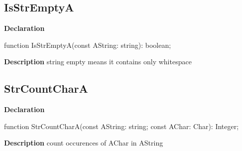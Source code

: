 \documentclass{report}
\newif\ifpdf
\begin{document}
\subsection*{IsStrEmptyA}
\fi
\label{PasDoc_Utils-IsStrEmptyA}
\begin{list}{}{
\setlength{\itemindent}{0cm}
\setlength{\listparindent}{0cm}
\setlength{\leftmargin}{\evensidemargin}
\addtolength{\leftmargin}{\tmplength}
\settowidth{\labelsep}{X}
\addtolength{\leftmargin}{\labelsep}
\setlength{\labelwidth}{\tmplength}
}
\item[\textbf{Declaration}\hfill]
\ifpdf
\begin{flushleft}
\fi
\begin{ttfamily}
function IsStrEmptyA(const AString: string): boolean;\end{ttfamily}

\ifpdf
\end{flushleft}
\fi

\par
\item[\textbf{Description}]
string empty means it contains only whitespace

\end{list}
\ifpdf
\subsection*{\large{\textbf{StrCountCharA}}\normalsize\hspace{1ex}\hrulefill}
\else
\subsection*{StrCountCharA}
\fi
\label{PasDoc_Utils-StrCountCharA}
\begin{list}{}{
\setlength{\itemindent}{0cm}
\setlength{\listparindent}{0cm}
\setlength{\leftmargin}{\evensidemargin}
\addtolength{\leftmargin}{\tmplength}
\settowidth{\labelsep}{X}
\addtolength{\leftmargin}{\labelsep}
\setlength{\labelwidth}{\tmplength}
}
\item[\textbf{Declaration}\hfill]
\ifpdf
\begin{flushleft}
\fi
\begin{ttfamily}
function StrCountCharA(const AString: string; const AChar: Char): Integer;\end{ttfamily}

\ifpdf
\end{flushleft}
\fi

\par
\item[\textbf{Description}]
count occurences of AChar in AString

\end{list}
\ifpdf
\end{document}

